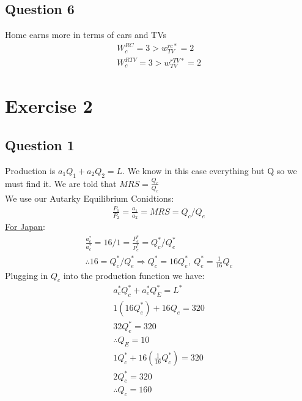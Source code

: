 \documentclass{article}
\begin{document}
\par \vspace{0.8em}
\subsection{Question 6}

Home earns more in terms of cars and TVs
\begin{gather*}
  W_{c}^{RC} = 3 > w_{TV}^{rc*} = 2 \\
  W_{c}^{RTV} = 3 > w_{TV}^{rTV*} = 2
\end{gather*}

\newpage

\section{Exercise 2}
\vspace{6mm}
\subsection{Question 1}

Production is $a_{1}Q_{1} + a_{2}Q_{2} = L$. We know in this case everything but Q so we must find it. We are told that $MRS = \tfrac{Q_{c}}{Q_{e}}$  \\
We use our Autarky Equilibrium Conidtions:
\begin{gather*}
  \frac{P_{1}}{P_{2}} = \frac{a_{1}}{a_{2}} = MRS = Q_{c}/Q_{e}
\end{gather*}
\underline{For Japan}:
\begin{gather*}
  \frac{a_{e}^{*}}{a_{c}^{*}} = 16/1 = \frac{P_{e}^{*}}{P_{c}^{*}} = Q_{c}^{*}/Q_{e}^{*} \\
  \therefore 16 = Q_{c}^{*}/Q_{e}^{*} \Rightarrow Q_{c}^{*} = 16Q_{e}^{*}, \ Q_{e}^{*} = \frac{1}{16}Q_{c}
\end{gather*}
Plugging in $Q_{c}$ into the production function we have:
\begin{gather*}
  a_{c}^{*}Q_{c}^{*} + a_{e}^{*}Q_{E}^{*} = L^{*} \\
  1(16Q_{e}^{*}) + 16Q_{e} = 320 \\
  32Q_{e}^{*} = 320 \\
  \therefore Q_{E} = 10 \\
  1Q_{c}^{*} + 16(\frac{1}{16}Q_{c}^{*}) = 320 \\
  2 Q_{c}^{*} = 320 \\
  \therefore Q_{c} = 160
\end{gather*}
\end{document}
